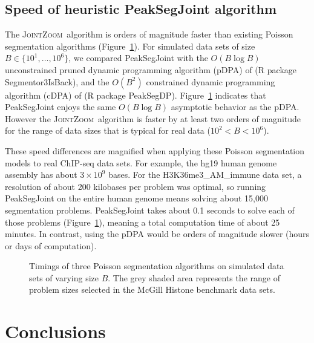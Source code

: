 \documentclass{article} %
\newcommand{\JointHeuristic}{\textsc{JointZoom}}
\begin{document}
\subsection{Speed of heuristic PeakSegJoint algorithm}

The \JointHeuristic\ algorithm is orders of magnitude faster than
existing Poisson segmentation algorithms
(Figure~\ref{fig:timings}). For simulated data sets of size
$B\in\{10^1, \dots, 10^6\}$, we compared PeakSegJoint with the
$O(B\log B)$ unconstrained pruned dynamic programming algorithm (pDPA)
of \citet{Segmentor} (R package Segmentor3IsBack), and the $O(B^2)$
constrained dynamic programming algorithm (cDPA) of
\citet{HOCKING-PeakSeg} (R package
PeakSegDP). Figure~\ref{fig:timings} indicates that PeakSegJoint
enjoys the same $O(B \log B)$ asymptotic behavior as the pDPA. However
the \JointHeuristic\ algorithm is faster by at least two orders of
magnitude for the range of data sizes that is typical for real data
($10^2 < B < 10^6$).

These speed differences are magnified when applying these Poisson
segmentation models to real ChIP-seq data sets. For example, the hg19
human genome assembly has about $3\times 10^9$ bases. For the
H3K36me3\_AM\_immune data set, a resolution of about 200 kilobases per
problem was optimal, so running PeakSegJoint on the entire human
genome means solving about 15,000 segmentation problems. PeakSegJoint
takes about 0.1 seconds to solve each of those problems
(Figure~\ref{fig:timings}), meaning a total computation time of about
25 minutes. In contrast, using the pDPA would be orders of magnitude
slower (hours or days of computation).

\begin{figure}[b!]
  \centering
  
  \vskip -0.5cm
  \caption{Timings of three Poisson segmentation algorithms on
    simulated data sets of varying size $B$. The grey shaded area
    represents the range of problem sizes selected in the McGill
    Histone benchmark data sets. }
  \label{fig:timings}
\end{figure}


\section{Conclusions}
\end{document}

